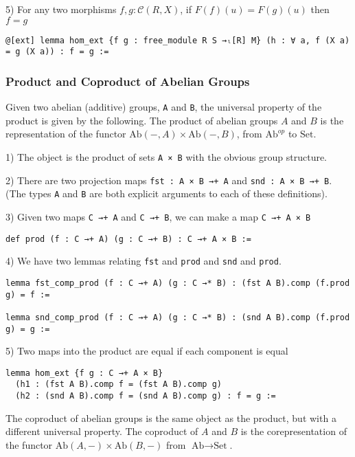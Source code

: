 \documentclass[12pt]{article} %
\theoremstyle{definition}
\theoremstyle{definition}
\theoremstyle{definition}
\theoremstyle{definition}
\begin{document}
5) For any two morphisms $f, g : \mathcal{C}(R, X)$, if $F(f)(u) = F(g)(u)$ then $f = g$
\begin{lstlisting}
@[ext] lemma hom_ext {f g : free_module R S →ₗ[R] M} (h : ∀ a, f (X a) = g (X a)) : f = g :=
\end{lstlisting}

\subsubsection{Product and Coproduct of Abelian Groups}

Given two abelian (additive) groups, \lstinline{A} and \lstinline {B},
the universal property of the product is given by the following.
The product of abelian groups $A$ and $B$ is the representation
of the functor $\text{Ab}(-, A) \times \text{Ab}(-, B)$, from
$\text{Ab}^{op}$ to $\text{Set}$.

1) The object is the product of sets \lstinline{A × B} with the obvious
group structure.

2) There are two projection maps \lstinline{fst : A × B →+ A} and
\lstinline{snd : A × B →+ B}. (The types \lstinline{A} and \lstinline{B}
are both explicit arguments to each of these definitions).

3) Given two maps \lstinline{C →+ A} and \lstinline{C →+ B}, we can make a map
\lstinline{C →+ A × B}
\begin{lstlisting}
def prod (f : C →+ A) (g : C →+ B) : C →+ A × B :=
\end{lstlisting}

4) We have two lemmas relating \lstinline{fst} and \lstinline{prod} and \lstinline{snd}
and \lstinline{prod}.
\begin{lstlisting}
lemma fst_comp_prod (f : C →+ A) (g : C →* B) : (fst A B).comp (f.prod g) = f :=

lemma snd_comp_prod (f : C →+ A) (g : C →* B) : (snd A B).comp (f.prod g) = g :=
\end{lstlisting}

5) Two maps into the product are equal if each component is equal
\begin{lstlisting}
lemma hom_ext {f g : C →+ A × B}
  (h1 : (fst A B).comp f = (fst A B).comp g)
  (h2 : (snd A B).comp f = (snd A B).comp g) : f = g :=
\end{lstlisting}

The coproduct of abelian groups is the same object as the product,
but with a different universal property. The coproduct of $A$ and $B$
is the corepresentation of the functor $\text{Ab}(A, -) \times \text{Ab}(B, -)$
from $\text{Ab} \to \text{Set}$.
\end{document}
